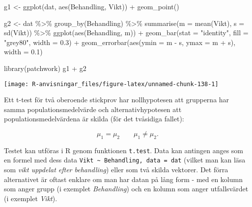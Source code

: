 \documentclass[
]{book}
\newenvironment{Shaded}{\begin{snugshade}}{\end{snugshade}}
\newcommand{\AttributeTok}[1]{\textcolor[rgb]{0.77,0.63,0.00}{#1}}
\newcommand{\FloatTok}[1]{\textcolor[rgb]{0.00,0.00,0.81}{#1}}
\newcommand{\FunctionTok}[1]{\textcolor[rgb]{0.00,0.00,0.00}{#1}}
\newcommand{\NormalTok}[1]{#1}
\newcommand{\OtherTok}[1]{\textcolor[rgb]{0.56,0.35,0.01}{#1}}
\newcommand{\SpecialCharTok}[1]{\textcolor[rgb]{0.00,0.00,0.00}{#1}}
\newcommand{\StringTok}[1]{\textcolor[rgb]{0.31,0.60,0.02}{#1}}
\theoremstyle{definition}
\theoremstyle{definition}
\theoremstyle{definition}
\theoremstyle{definition}
\theoremstyle{remark}
\begin{document}
\begin{Shaded}
\begin{Highlighting}[]
\NormalTok{g1 }\OtherTok{\textless{}{-}} \FunctionTok{ggplot}\NormalTok{(dat, }\FunctionTok{aes}\NormalTok{(Behandling, Vikt)) }\SpecialCharTok{+}
  \FunctionTok{geom\_point}\NormalTok{()}

\NormalTok{g2 }\OtherTok{\textless{}{-}}\NormalTok{ dat }\SpecialCharTok{\%\textgreater{}\%} 
  \FunctionTok{group\_by}\NormalTok{(Behandling) }\SpecialCharTok{\%\textgreater{}\%} 
  \FunctionTok{summarise}\NormalTok{(}\AttributeTok{m =} \FunctionTok{mean}\NormalTok{(Vikt), }\AttributeTok{s =} \FunctionTok{sd}\NormalTok{(Vikt)) }\SpecialCharTok{\%\textgreater{}\%} 
  \FunctionTok{ggplot}\NormalTok{(}\FunctionTok{aes}\NormalTok{(Behandling, m)) }\SpecialCharTok{+}
  \FunctionTok{geom\_bar}\NormalTok{(}\AttributeTok{stat =} \StringTok{"identity"}\NormalTok{, }\AttributeTok{fill =} \StringTok{"grey80"}\NormalTok{, }\AttributeTok{width =} \FloatTok{0.3}\NormalTok{) }\SpecialCharTok{+}
  \FunctionTok{geom\_errorbar}\NormalTok{(}\FunctionTok{aes}\NormalTok{(}\AttributeTok{ymin =}\NormalTok{ m }\SpecialCharTok{{-}}\NormalTok{ s, }\AttributeTok{ymax =}\NormalTok{ m }\SpecialCharTok{+}\NormalTok{ s), }\AttributeTok{width =} \FloatTok{0.1}\NormalTok{)}

\FunctionTok{library}\NormalTok{(patchwork)}
\NormalTok{g1 }\SpecialCharTok{+}\NormalTok{ g2}
\end{Highlighting}
\end{Shaded}

\begin{center}\texttt{[image: R-anvisningar\_files/figure-latex/unnamed-chunk-138-1]} \end{center}

Ett t-test för två oberoende stickprov har nollhypotesen att grupperna har samma populationsmedelvärde och alternativhypotesen att populationsmedelvärdena är skilda (för det tvåsidiga fallet):

\[\mu_1 = \mu_2 \qquad \mu_1 \neq \mu_2.\]

Testet kan utföras i R genom funktionen \texttt{t.test}. Data kan antingen anges som en formel med dess data \texttt{Vikt\ \textasciitilde{}\ Behandling,\ data\ =\ dat} (vilket man kan läsa som \emph{vikt uppdelat efter behandling}) eller som två skilda vektorer. Det förra alternativet är oftast enklare om man har datan på lång form - med en kolumn som anger grupp (i exemplet \emph{Behandling}) och en kolumn som anger utfallsvärdet (i exemplet \emph{Vikt}).
\end{document}
